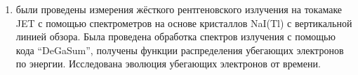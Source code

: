 \begin{enumerate}
  \item были проведены измерения жёсткого рентгеновского излучения на токамаке JET с помощью спектрометров на основе кристаллов NaI(Tl) с вертикальной линией обзора. Была проведена обработка спектров излучения с помощью кода ``DeGaSum'', получены функции распределения убегающих электронов по энергии. Исследована эволюция убегающих электронов от времени.

\end{enumerate}
